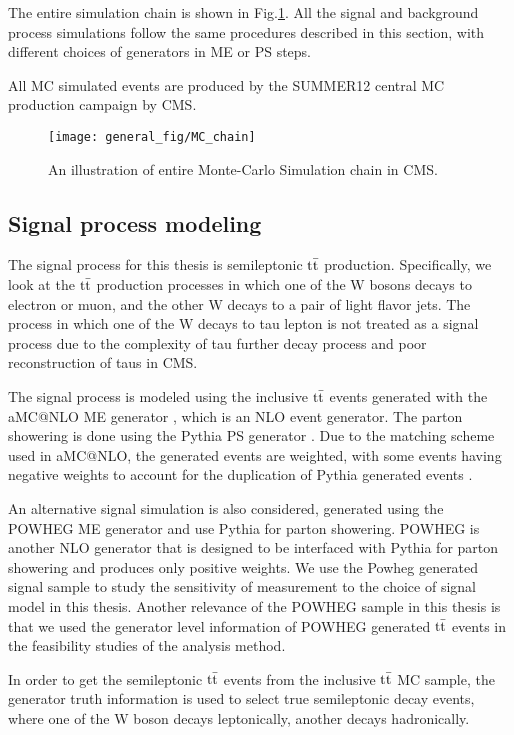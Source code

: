 The entire simulation chain is shown in Fig.\ref{fig:mcchain}. All the signal and background process simulations follow the same procedures described in this section, with different choices of generators in ME or PS steps.

All MC simulated events are produced by the SUMMER12 central MC production campaign by CMS.

\begin{figure}
	\centering
	\texttt{[image: general\_fig/MC\_chain]}
	\caption[MC chain in CMS]
	{An illustration of entire Monte-Carlo Simulation chain in CMS. \cite{Goerner:1754332}}
	\label{fig:mcchain}
\end{figure}


\subsection{Signal process modeling}
The signal process for this thesis is semileptonic $\mathrm{t}\bar{\mathrm{t}}$ production. Specifically, we look at the $\mathrm{t}\bar{\mathrm{t}}$ production processes in which one of the W bosons decays to electron or muon, and the other W decays to a pair of light flavor jets. The process in which one of the W decays to tau lepton is not treated as a signal process due to the complexity of tau further decay process and poor reconstruction of taus in CMS.

The signal process is modeled using the inclusive $\mathrm{t}\bar{\mathrm{t}}$ events generated with the aMC@NLO ME generator \cite{aMC@NLO}, which is an NLO event generator. The parton showering is done using the Pythia PS generator \cite{Pythia}. Due to the matching scheme used in aMC@NLO, the generated events are weighted, with some events having negative weights to account for the duplication of Pythia generated events \cite{MC@NLOmatching}. 

An alternative signal simulation is also considered, generated using the POWHEG ME generator and use Pythia for parton showering. POWHEG is another NLO generator \cite{powheg} that is designed to be interfaced with Pythia for parton showering and produces only positive weights. We use the Powheg generated signal sample to study the sensitivity of measurement to the choice of signal model in this thesis. Another relevance of the POWHEG sample in this thesis is that we used the generator level information of POWHEG generated $\mathrm{t}\bar{\mathrm{t}}$ events in the feasibility studies of the analysis method. 

In order to get the semileptonic $\mathrm{t}\bar{\mathrm{t}}$ events from the inclusive $\mathrm{t}\bar{\mathrm{t}}$ MC sample, the generator truth information is used to select true semileptonic decay events, where one of the W boson decays leptonically, another decays hadronically.  

